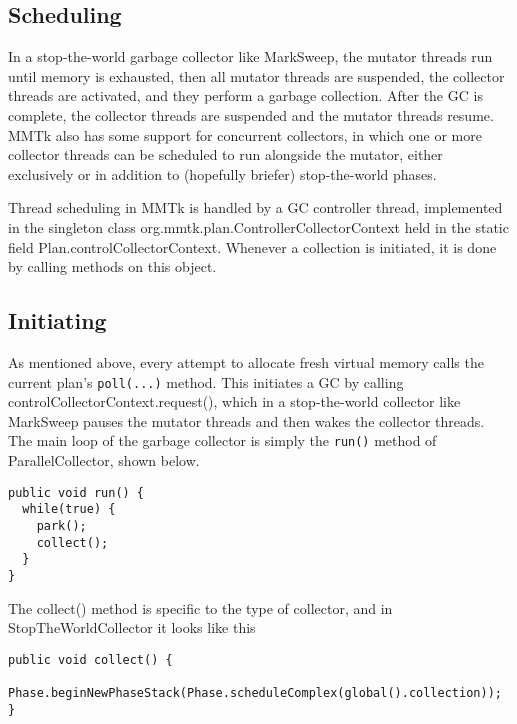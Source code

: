 \subsection{Scheduling}

In a stop-the-world garbage collector like MarkSweep, the mutator threads run until memory is exhausted, then all mutator threads are suspended, the collector threads are activated, and they perform a garbage collection.  After the GC is complete, the collector threads are suspended and the mutator threads resume.  MMTk also has some support for concurrent collectors, in which one or more collector threads can be scheduled to run alongside the mutator, either exclusively or in addition to (hopefully briefer) stop-the-world phases. 

Thread scheduling in MMTk is handled by a GC controller thread, implemented in the singleton class org.mmtk.plan.ControllerCollectorContext  held in the static field Plan.controlCollectorContext. Whenever a collection is initiated, it is done by calling methods on this object.

\subsection{Initiating}

As mentioned above, every attempt to allocate fresh virtual memory calls the 
current plan's \lstinline|poll(...)| method.  This initiates a GC by calling
controlCollectorContext.request(), which in a stop-the-world collector like 
MarkSweep pauses the mutator threads and then wakes the collector threads.  
The main loop of the garbage collector is simply the \lstinline|run()| method of
ParallelCollector, shown below.

\begin{lstlisting}[name=ParallelCollector.java,caption=\lstname: the main loop of a collector
thread.,label=fig:gc:collector-run]
public void run() {
  while(true) {
    park();
    collect();
  }
}
\end{lstlisting}
The collect() method is specific to the type of collector, and in StopTheWorldCollector it looks like this

\begin{lstlisting}[name=StopTheWorldCollector.java,caption=\lstname: performing a garbage collection.,label=fig:gc:stw-collect]
public void collect() {
  Phase.beginNewPhaseStack(Phase.scheduleComplex(global().collection));
}
\end{lstlisting}

